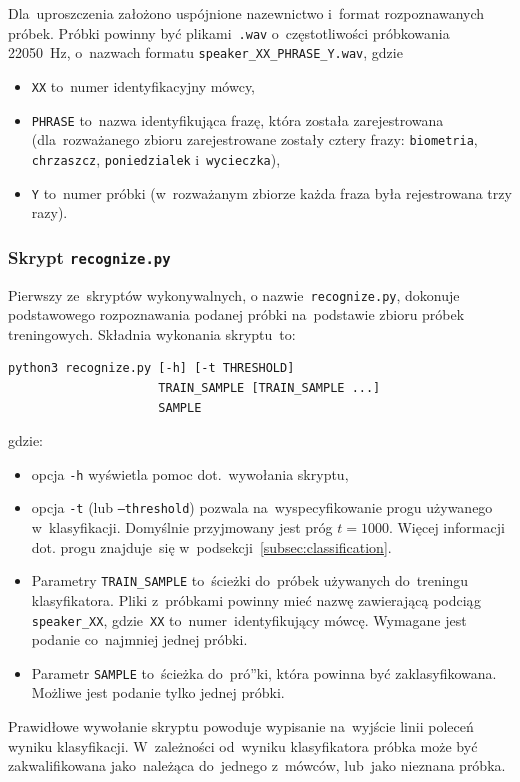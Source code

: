 \documentclass[11pt,a4paper]{article}
\begin{document}
Dla~uproszczenia założono uspójnione nazewnictwo i~format rozpoznawanych próbek.
Próbki powinny być plikami~\texttt{.wav} o~częstotliwości próbkowania 22050~Hz, o~nazwach formatu \texttt{speaker\_XX\_PHRASE\_Y.wav}, gdzie
\begin{itemize}
    \item \texttt{XX} to~numer identyfikacyjny mówcy,
    \item \texttt{PHRASE} to~nazwa identyfikująca frazę, która została zarejestrowana (dla~rozważanego zbioru zarejestrowane zostały cztery frazy: \texttt{biometria}, \texttt{chrzaszcz}, \texttt{poniedzialek} i~\texttt{wycieczka}),
    \item \texttt{Y} to~numer próbki (w~rozważanym zbiorze każda fraza była rejestrowana trzy razy).
\end{itemize}

\subsubsection{Skrypt \texttt{recognize.py}}

Pierwszy ze~skryptów wykonywalnych, o nazwie~\texttt{recognize.py}, dokonuje podstawowego rozpoznawania podanej próbki na~podstawie zbioru próbek treningowych.
Składnia wykonania skryptu~to:
\begin{verbatim}
python3 recognize.py [-h] [-t THRESHOLD]
                     TRAIN_SAMPLE [TRAIN_SAMPLE ...]
                     SAMPLE
\end{verbatim}
gdzie:
\begin{itemize}
    \item opcja \texttt{-h} wyświetla pomoc dot.~wywołania skryptu,
    \item opcja \texttt{-t} (lub \texttt{--threshold}) pozwala na~wyspecyfikowanie progu używanego w~klasyfikacji.
        Domyślnie przyjmowany jest próg $t = 1000$.
        Więcej informacji dot. progu znajduje~się w~podsekcji~\ref{subsec:classification}.
    \item Parametry \texttt{TRAIN\_SAMPLE} to~ścieżki do~próbek używanych do~treningu klasyfikatora.
        Pliki z~próbkami powinny mieć nazwę zawierającą podciąg \texttt{speaker\_XX}, gdzie~\texttt{XX} to~numer~identyfikujący mówcę.
        Wymagane jest podanie co~najmniej jednej próbki.
    \item Parametr \texttt{SAMPLE} to~ścieżka do~pró”ki, która powinna być zaklasyfikowana.
        Możliwe jest podanie tylko jednej próbki.
\end{itemize}
Prawidłowe wywołanie skryptu powoduje wypisanie na~wyjście linii poleceń wyniku klasyfikacji.
W~zależności od~wyniku klasyfikatora próbka może być zakwalifikowana jako~należąca do~jednego z~mówców, lub~jako nieznana próbka.
\end{document}
